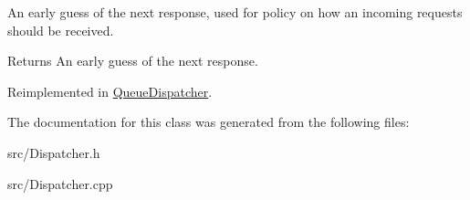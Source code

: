 An early guess of the next response, used for policy on how an incoming requests should be received. 

\begin{DoxyReturn}{Returns}
An early guess of the next response. 
\end{DoxyReturn}


Reimplemented in \hyperlink{class_queue_dispatcher_acea23f016b5fd62ec7cc94ee1db1816e}{Queue\+Dispatcher}.



The documentation for this class was generated from the following files\+:\begin{DoxyCompactItemize}
\item 
src/Dispatcher.\+h\item 
src/Dispatcher.\+cpp\end{DoxyCompactItemize}
